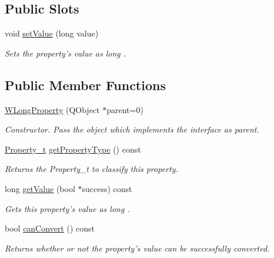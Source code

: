 \subsection*{Public Slots}
\begin{DoxyCompactItemize}
\item 
void \hyperlink{class_w_long_property_a872aed166209715a26dd676b8b4e7fb4}{set\-Value} (long value)
\begin{DoxyCompactList}\small\item\em Sets the property's value as long . \end{DoxyCompactList}\end{DoxyCompactItemize}
\subsection*{Public Member Functions}
\begin{DoxyCompactItemize}
\item 
\hyperlink{class_w_long_property_af8f2e6601d3bfd7a70a9f061bdb19fb3}{W\-Long\-Property} (Q\-Object $\ast$parent=0)
\begin{DoxyCompactList}\small\item\em Constructor. Pass the object which implements the interface as parent. \end{DoxyCompactList}\item 
\hyperlink{group___property_classes_ga38f1ccddda12c7cb50b868c9f789ee37}{Property\-\_\-t} \hyperlink{class_w_long_property_a0511fc3ecd73ac409337251d7f54b1d2}{get\-Property\-Type} () const 
\begin{DoxyCompactList}\small\item\em Returns the Property\-\_\-t to classify this property. \end{DoxyCompactList}\item 
long \hyperlink{class_w_long_property_a2832bb647a51aa6688d4323e44254314}{get\-Value} (bool $\ast$success) const 
\begin{DoxyCompactList}\small\item\em Gets this property's value as long . \end{DoxyCompactList}\item 
bool \hyperlink{class_w_long_property_af0761e534c58bf6b41776dc1298daf8a}{can\-Convert} () const 
\begin{DoxyCompactList}\small\item\em Returns whether or not the property's value can be successfully converted. \end{DoxyCompactList}\end{DoxyCompactItemize}
